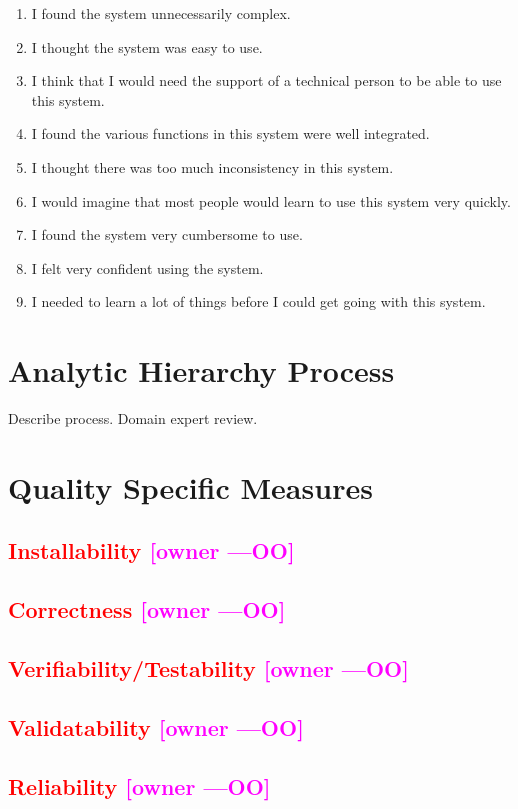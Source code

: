 \documentclass[letterpaper,cleveref]{lipics-v2019}
\newcommand{\authornote}[3]{\textcolor{#1}{[#3 ---#2]}}
\newcommand{\authornote}[3]{}
\newcommand{\oo}[1]{\authornote{magenta}{OO}{#1}} %
\newcommand{\notdone}[1]{\textcolor{red}{#1}}
\theoremstyle{definition}
\begin{document}
\begin {enumerate}
\item I found the system unnecessarily complex.
\item I thought the system was easy to use.
\item I think that I would need the support of a technical person to be able to use this system.
\item I found the various functions in this system were well integrated.
\item I thought there was too much inconsistency in this system.
\item I would imagine that most people would learn to use this system very quickly.
\item I found the system very cumbersome to use.
\item I felt very confident using the system.
\item I needed to learn a lot of things before I could get going with this system.
\end {enumerate}
\section{Analytic Hierarchy Process}

Describe process.  Domain expert review.

\section{Quality Specific Measures}

\subsection{\notdone{Installability} \oo{owner}}

\subsection{\notdone{Correctness} \oo{owner}}

\subsection{\notdone{Verifiability/Testability} \oo{owner}}

\subsection{\notdone{Validatability} \oo{owner}}

\subsection{\notdone{Reliability} \oo{owner}}
\end{document}
